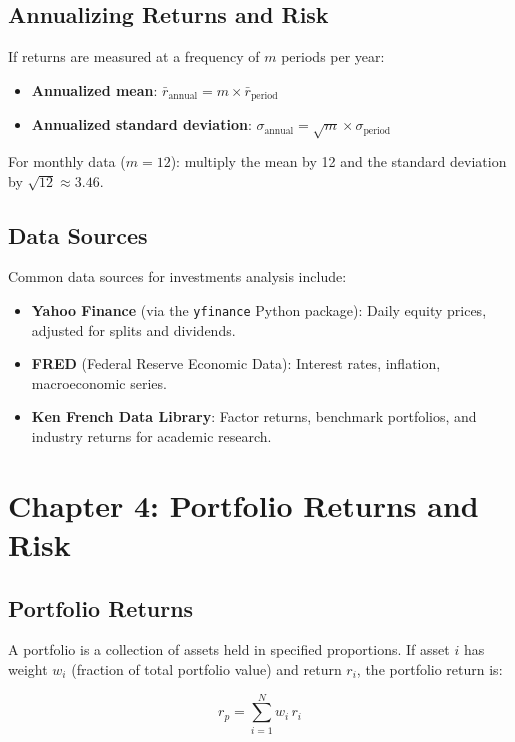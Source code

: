 \documentclass[11pt,letterpaper]{report}
\begin{document}
\section{Annualizing Returns and Risk}


If returns are measured at a frequency of $m$ periods per year:

\begin{itemize}
  \item \textbf{Annualized mean}: $\bar{r}_{\text{annual}} = m \times \bar{r}_{\text{period}}$
  \item \textbf{Annualized standard deviation}: $\sigma_{\text{annual}} = \sqrt{m} \times \sigma_{\text{period}}$
\end{itemize}

For monthly data ($m=12$): multiply the mean by 12 and the standard deviation by $\sqrt{12} \approx 3.46$.

\section{Data Sources}


Common data sources for investments analysis include:

\begin{itemize}
  \item \textbf{Yahoo Finance} (via the \texttt{yfinance} Python package): Daily equity prices, adjusted for splits and dividends.
  \item \textbf{FRED} (Federal Reserve Economic Data): Interest rates, inflation, macroeconomic series.
  \item \textbf{Ken French Data Library}: Factor returns, benchmark portfolios, and industry returns for academic research.
\end{itemize}


\chapter{Chapter 4: Portfolio Returns and Risk}


\section{Portfolio Returns}


A portfolio is a collection of assets held in specified proportions.  If asset $i$ has weight $w_i$ (fraction of total portfolio value) and return $r_i$, the portfolio return is:

$$r_p = \sum_{i=1}^{N} w_i \, r_i$$
\end{document}
